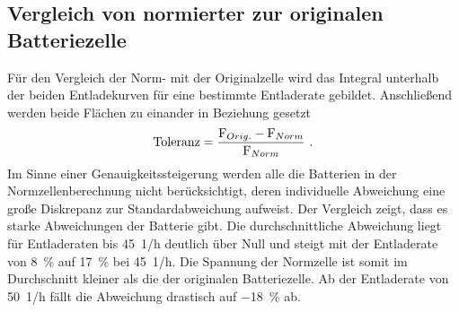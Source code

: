 \begin{appendix}
\section{Vergleich von normierter zur originalen Batteriezelle}
Für den Vergleich der Norm- mit der Originalzelle wird das Integral unterhalb der beiden Entladekurven für eine bestimmte Entladerate gebildet. Anschließend werden beide Flächen zu einander in Beziehung gesetzt 
\begin{equation}
	\text{Toleranz} = \frac{\text{F}_{Orig.}-\text{F}_{Norm}}{\text{F}_{Norm}} ~\text{.}
\end{equation} 
Im Sinne einer Genauigkeitssteigerung werden alle die Batterien in der Normzellenberechnung nicht berücksichtigt, deren individuelle Abweichung eine große Diskrepanz zur Standardabweichung aufweist. Der Vergleich zeigt, dass es starke Abweichungen der Batterie gibt. Die durchschnittliche Abweichung liegt für Entladeraten bis \SI{45}{1/h} deutlich über Null und steigt mit der Entladerate von \SI{8}{\%} auf \SI{17}{\%} bei \SI{45}{1/h}. Die Spannung der Normzelle ist somit im Durchschnitt kleiner als die der originalen Batteriezelle. Ab der Entladerate von \SI{50}{1/h} fällt die Abweichung drastisch auf \SI{-18}{\%} ab. 




\end{appendix}
